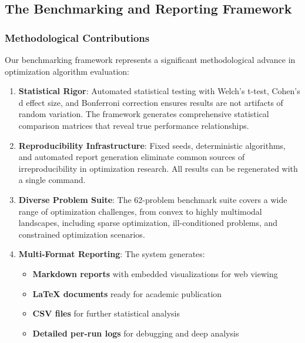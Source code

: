 \hypertarget{the-benchmarking-and-reporting-framework}{%
\subsection{The Benchmarking and Reporting Framework}\label{the-benchmarking-and-reporting-framework}}

\hypertarget{methodological-contributions}{%
\subsubsection{Methodological Contributions}\label{methodological-contributions}}

Our benchmarking framework represents a significant methodological advance in optimization algorithm evaluation:

\begin{enumerate}
\def\labelenumi{\arabic{enumi}.}
\item
  \textbf{Statistical Rigor}: Automated statistical testing with Welch's t-test, Cohen's d effect size, and Bonferroni correction ensures results are not artifacts of random variation. The framework generates comprehensive statistical comparison matrices that reveal true performance relationships.
\item
  \textbf{Reproducibility Infrastructure}: Fixed seeds, deterministic algorithms, and automated report generation eliminate common sources of irreproducibility in optimization research. All results can be regenerated with a single command.
\item
  \textbf{Diverse Problem Suite}: The 62-problem benchmark suite covers a wide range of optimization challenges, from convex to highly multimodal landscapes, including sparse optimization, ill-conditioned problems, and constrained optimization scenarios.
\item
  \textbf{Multi-Format Reporting}: The system generates:

  \begin{itemize}
  \tightlist
  \item
    \textbf{Markdown reports} with embedded visualizations for web viewing
  \item
    \textbf{LaTeX documents} ready for academic publication
  \item
    \textbf{CSV files} for further statistical analysis
  \item
    \textbf{Detailed per-run logs} for debugging and deep analysis
  \end{itemize}
\end{enumerate}

